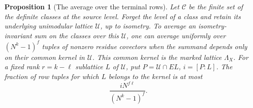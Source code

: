 \documentclass[a4paper,11pt]{article}
\newtheorem{proposition}{Proposition}[section]
\theoremstyle{definition}
\theoremstyle{remark}
\numberwithin{equation}{section}
\begin{document}
\begin{proposition}[The average over the terminal rows]
\leavevmode\label{prop:rowmean690}
Let \(\mathcal C\) be the finite set of the definite classes
at the source level. Forget the level of a class and retain
its underlying unimodular lattice \(\mathcal U\), up to
isometry. To average an isometry-invariant sum on the classes
over this \(\mathcal U\), one can average uniformly over
\((N^k-1)^f\) tuples of nonzero residue covectors when the
summand depends only on their common kernel in \(\mathcal U\).
This common kernel is the marked lattice \(\Lambda_X\).
For a fixed rank \(r=k-\ell\) sublattice \(L\) of \(\mathcal U\),
put \(P=\mathcal U\cap E L\), \(i=[P:L]\). The fraction of
row tuples for which \(L\) belongs to the kernel is at most
\[
             \frac{i N^{f\ell}}{(N^k-1)^f}.
\]
\end{proposition}
\end{document}
